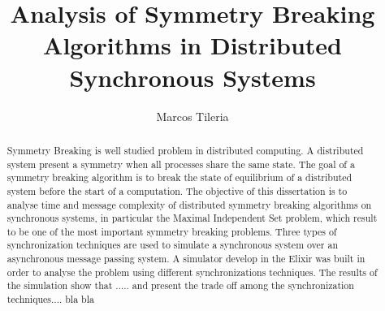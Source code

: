 \documentclass[11pt]{article} %
\title{Analysis of Symmetry Breaking Algorithms in Distributed Synchronous Systems}
\author{Marcos Tileria}
\theoremstyle{plain}
\theoremstyle{definition}
\begin{document}
\maketitle

\declaration

\begin{abstract}
  
 Symmetry Breaking is well studied problem in distributed computing. A distributed system present a symmetry when all processes share the same state. The goal of a symmetry breaking algorithm  is to break the state of equilibrium of a distributed system before the start of a computation. The objective of this dissertation is to analyse time and message complexity of distributed symmetry breaking algorithms on synchronous systems, in particular the Maximal Independent Set problem, which result to be one of the most important symmetry breaking problems. Three types of synchronization techniques are used to simulate a synchronous system over an asynchronous message passing system. A simulator develop in the Elixir was built in order to analyse the problem using different synchronizations techniques. The results of the simulation show that ..... and present the trade off among the synchronization techniques.... bla bla 
  

\end{abstract}






















\end{document}
